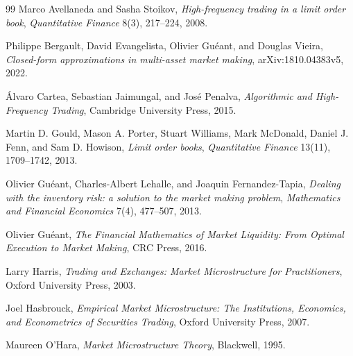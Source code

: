 \documentclass[a4paper,10pt,titlepage,oneside,openany]{book}
\theoremstyle{plain}\newtheorem{theorem}{Theorem}[chapter]
\theoremstyle{definition}\newtheorem{definition}{Definition}[chapter]
\theoremstyle{remark}\newtheorem{remark}{Remark}[chapter]
\newenvironment{references}{\begin{thebibliography}{99}}{\end{thebibliography}}
\begin{document}
\begin{references}
Marco Avellaneda and Sasha Stoikov,
\emph{High-frequency trading in a limit order book},
\emph{Quantitative Finance} 8(3), 217--224, 2008.

Philippe Bergault, David Evangelista, Olivier Gu\'eant, and Douglas Vieira,
\emph{Closed-form approximations in multi-asset market making},
arXiv:1810.04383v5, 2022.

\'Alvaro Cartea, Sebastian Jaimungal, and Jos\'e Penalva,
\emph{Algorithmic and High-Frequency Trading},
Cambridge University Press, 2015.

Martin D. Gould, Mason A. Porter, Stuart Williams, Mark McDonald, Daniel J. Fenn, and Sam D. Howison,
\emph{Limit order books},
\emph{Quantitative Finance} 13(11), 1709--1742, 2013.

Olivier Gu\'eant, Charles-Albert Lehalle, and Joaquin Fernandez-Tapia,
\emph{Dealing with the inventory risk: a solution to the market making problem},
\emph{Mathematics and Financial Economics} 7(4), 477--507, 2013.

Olivier Gu\'eant,
\emph{The Financial Mathematics of Market Liquidity: From Optimal Execution to Market Making},
CRC Press, 2016.

Larry Harris,
\emph{Trading and Exchanges: Market Microstructure for Practitioners},
Oxford University Press, 2003.

Joel Hasbrouck,
\emph{Empirical Market Microstructure: The Institutions, Economics, and Econometrics of Securities Trading},
Oxford University Press, 2007.

Maureen O'Hara,
\emph{Market Microstructure Theory},
Blackwell, 1995.
\end{references}
\end{document}
